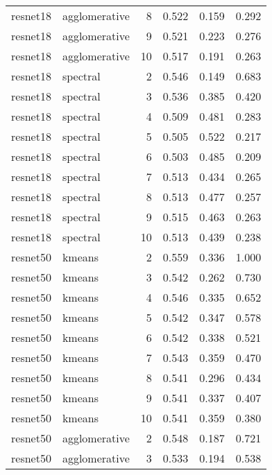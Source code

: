 \begin{longtable}{llrrrr}
   resnet18 & agglomerative &  8 &            0.522 &   0.159 &    0.292 \\
   resnet18 & agglomerative &  9 &            0.521 &   0.223 &    0.276 \\
   resnet18 & agglomerative & 10 &            0.517 &   0.191 &    0.263 \\
   resnet18 &      spectral &  2 &            0.546 &   0.149 &    0.683 \\
   resnet18 &      spectral &  3 &            0.536 &   0.385 &    0.420 \\
   resnet18 &      spectral &  4 &            0.509 &   0.481 &    0.283 \\
   resnet18 &      spectral &  5 &            0.505 &   0.522 &    0.217 \\
   resnet18 &      spectral &  6 &            0.503 &   0.485 &    0.209 \\
   resnet18 &      spectral &  7 &            0.513 &   0.434 &    0.265 \\
   resnet18 &      spectral &  8 &            0.513 &   0.477 &    0.257 \\
   resnet18 &      spectral &  9 &            0.515 &   0.463 &    0.263 \\
   resnet18 &      spectral & 10 &            0.513 &   0.439 &    0.238 \\
   resnet50 &        kmeans &  2 &            0.559 &   0.336 &    1.000 \\
   resnet50 &        kmeans &  3 &            0.542 &   0.262 &    0.730 \\
   resnet50 &        kmeans &  4 &            0.546 &   0.335 &    0.652 \\
   resnet50 &        kmeans &  5 &            0.542 &   0.347 &    0.578 \\
   resnet50 &        kmeans &  6 &            0.542 &   0.338 &    0.521 \\
   resnet50 &        kmeans &  7 &            0.543 &   0.359 &    0.470 \\
   resnet50 &        kmeans &  8 &            0.541 &   0.296 &    0.434 \\
   resnet50 &        kmeans &  9 &            0.541 &   0.337 &    0.407 \\
   resnet50 &        kmeans & 10 &            0.541 &   0.359 &    0.380 \\
   resnet50 & agglomerative &  2 &            0.548 &   0.187 &    0.721 \\
   resnet50 & agglomerative &  3 &            0.533 &   0.194 &    0.538 \\

\end{longtable}

